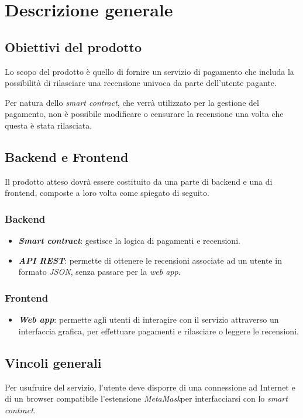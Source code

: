 \section{Descrizione generale}

    \subsection{Obiettivi del prodotto}
    Lo scopo del prodotto è quello di fornire un servizio di pagamento che includa la possibilità di rilasciare una recensione univoca da parte dell'utente pagante.

    Per natura dello \textit{smart contract}\glo \:, che verrà utilizzato per la gestione del pagamento, non è possibile modificare o censurare la recensione una volta che questa è stata rilasciata.

    \subsection{Backend e Frontend}
    Il prodotto atteso dovrà essere costituito da una parte di backend e una di frontend, composte a loro volta come spiegato di seguito.

        \subsubsection{Backend}
        \begin{itemize}
            \item \textit{\textbf{Smart contract}}: gestisce la logica di pagamenti e recensioni.
            \item \textit{\textbf{API REST}}\glo : permette di ottenere le recensioni associate ad un utente in formato \textit{JSON}\glo , senza passare per la \textit{web app}.
        \end{itemize}

        \subsubsection{Frontend}
        \begin{itemize}
            \item \textit{\textbf{Web app}}: permette agli utenti di interagire con il servizio attraverso un interfaccia grafica, per effettuare pagamenti e rilasciare o leggere le recensioni.
        \end{itemize}
    \subsection{Vincoli generali}
    Per usufruire del servizio, l'utente deve disporre di una connessione ad Internet e di un browser compatibile l'estensione \textit{MetaMask}\glo\:per interfacciarsi con lo \textit{smart contract}.